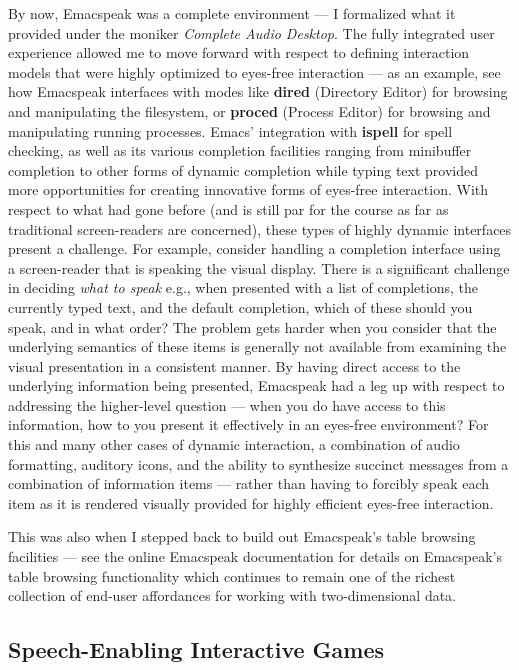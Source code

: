 \documentclass[11pt]{article}
\begin{document}
By now, Emacspeak was a complete environment — I formalized what
it provided under the moniker \emph{Complete Audio Desktop}. The fully
integrated user experience allowed me to move forward with
respect to defining interaction models that were highly optimized
to eyes-free interaction — as an example, see how Emacspeak
interfaces with modes like \textbf{dired} (Directory Editor) for
browsing and manipulating the filesystem, or \textbf{proced} (Process
Editor) for browsing and manipulating running processes. Emacs'
integration with \textbf{ispell} for spell checking, as well as its
various completion facilities ranging from minibuffer completion
to other forms of dynamic completion while typing text provided
more opportunities for creating innovative forms of eyes-free
interaction. With respect to what had gone before (and is still
par for the course as far as traditional screen-readers are
concerned), these types of highly dynamic interfaces present a
challenge. For example, consider handling a completion interface
using a screen-reader that is speaking the visual display. There
is a significant challenge in deciding \emph{what to speak} e.g., when
presented with a list of completions, the currently typed text,
and the default completion, which of these should you speak, and
in what order? The problem gets harder when you consider that the
underlying semantics of these items is generally not available
from examining the visual presentation in a consistent manner. By
having direct access to the underlying information being
presented, Emacspeak had a leg up with respect to addressing the
higher-level question — when you do have access to this
information, how to you present it effectively in an eyes-free
environment? For this and many other cases of dynamic
interaction, a combination of audio formatting, auditory icons,
and the ability to synthesize succinct messages from a
combination of information items — rather than having to forcibly
speak each item as it is rendered visually provided for highly
efficient eyes-free interaction.


This was also when I stepped back to build out Emacspeak's table
browsing facilities — see the online Emacspeak documentation for
details on Emacspeak's table browsing functionality which
continues to remain one of the richest collection of end-user
affordances for working with two-dimensional data.

\subsection{Speech-Enabling Interactive Games}
\label{sec-9-1}
\end{document}
